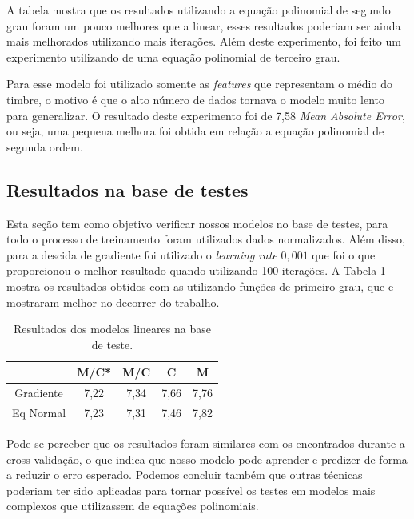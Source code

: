 \documentclass[conference]{IEEEtran}
\begin{document}
A tabela mostra que os resultados utilizando a equação polinomial de segundo grau foram um pouco melhores que a linear, esses resultados poderiam ser ainda mais melhorados utilizando mais iterações. Além deste experimento, foi feito um experimento utilizando de uma equação polinomial de terceiro grau.

Para esse modelo foi utilizado somente as \emph{features} que representam o médio do timbre, o motivo é que o alto número de dados tornava o modelo muito lento para generalizar. O resultado deste experimento foi de 7,58 \emph{Mean Absolute Error}, ou seja, uma pequena melhora foi obtida em relação a equação polinomial de segunda ordem.


\subsection{Resultados na base de testes }

Esta seção tem como objetivo verificar nossos modelos no base de testes, para todo o processo de treinamento foram utilizados dados normalizados. Além disso, para a descida de gradiente foi utilizado o \emph{learning rate} $0,001$ que foi o que proporcionou o melhor resultado quando utilizando 100 iterações. A Tabela \ref{tab:result} mostra os resultados obtidos com as utilizando funções de primeiro grau, que e mostraram melhor no decorrer do trabalho.


\begin{table}[!h]
	\centering

	\begin{tabular}{ccccc}
		\hline
		& \textbf{M/C*} & \textbf{M/C} & \textbf{C} & \textbf{M} \\ \hline
		Gradiente & 7,22          & 7,34         & 7,66       & 7,76       \\
		Eq Normal & 7,23          & 7,31         & 7,46       & 7,82       \\ \hline
	\end{tabular}
	\caption{Resultados dos modelos lineares na base de teste.}
	\label{tab:result}
\end{table}

Pode-se perceber que os resultados foram similares com os encontrados durante a cross-validação, o que indica que nosso modelo pode aprender e predizer de forma a reduzir o erro esperado. Podemos concluir também que outras técnicas poderiam ter sido aplicadas para tornar possível os testes em modelos mais complexos que utilizassem de equações polinomiais.
\end{document}
